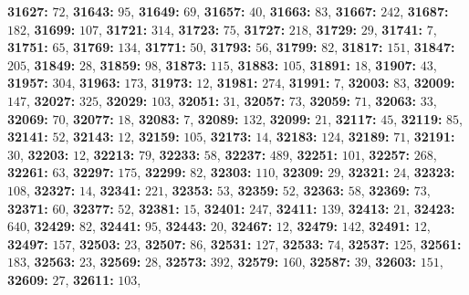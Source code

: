 \textsf{\bfseries 31627:} $72$, \textsf{\bfseries 31643:} $95$, \textsf{\bfseries 31649:} $69$, \textsf{\bfseries 31657:} $40$, \textsf{\bfseries 31663:} $83$, \textsf{\bfseries 31667:} $242$, \textsf{\bfseries 31687:} $182$, \textsf{\bfseries 31699:} $107$, \textsf{\bfseries 31721:} $314$, \textsf{\bfseries 31723:} $75$, \textsf{\bfseries 31727:} $218$, \textsf{\bfseries 31729:} $29$, \textsf{\bfseries 31741:} $7$, \textsf{\bfseries 31751:} $65$, \textsf{\bfseries 31769:} $134$, \textsf{\bfseries 31771:} $50$, \textsf{\bfseries 31793:} $56$, \textsf{\bfseries 31799:} $82$, \textsf{\bfseries 31817:} $151$, \textsf{\bfseries 31847:} $205$, \textsf{\bfseries 31849:} $28$, \textsf{\bfseries 31859:} $98$, \textsf{\bfseries 31873:} $115$, \textsf{\bfseries 31883:} $105$, \textsf{\bfseries 31891:} $18$, \textsf{\bfseries 31907:} $43$, \textsf{\bfseries 31957:} $304$, \textsf{\bfseries 31963:} $173$, \textsf{\bfseries 31973:} $12$, \textsf{\bfseries 31981:} $274$, \textsf{\bfseries 31991:} $7$, \textsf{\bfseries 32003:} $83$, \textsf{\bfseries 32009:} $147$, \textsf{\bfseries 32027:} $325$, \textsf{\bfseries 32029:} $103$, \textsf{\bfseries 32051:} $31$, \textsf{\bfseries 32057:} $73$, \textsf{\bfseries 32059:} $71$, \textsf{\bfseries 32063:} $33$, \textsf{\bfseries 32069:} $70$, \textsf{\bfseries 32077:} $18$, \textsf{\bfseries 32083:} $7$, \textsf{\bfseries 32089:} $132$, \textsf{\bfseries 32099:} $21$, \textsf{\bfseries 32117:} $45$, \textsf{\bfseries 32119:} $85$, \textsf{\bfseries 32141:} $52$, \textsf{\bfseries 32143:} $12$, \textsf{\bfseries 32159:} $105$, \textsf{\bfseries 32173:} $14$, \textsf{\bfseries 32183:} $124$, \textsf{\bfseries 32189:} $71$, \textsf{\bfseries 32191:} $30$, \textsf{\bfseries 32203:} $12$, \textsf{\bfseries 32213:} $79$, \textsf{\bfseries 32233:} $58$, \textsf{\bfseries 32237:} $489$, \textsf{\bfseries 32251:} $101$, \textsf{\bfseries 32257:} $268$, \textsf{\bfseries 32261:} $63$, \textsf{\bfseries 32297:} $175$, \textsf{\bfseries 32299:} $82$, \textsf{\bfseries 32303:} $110$, \textsf{\bfseries 32309:} $29$, \textsf{\bfseries 32321:} $24$, \textsf{\bfseries 32323:} $108$, \textsf{\bfseries 32327:} $14$, \textsf{\bfseries 32341:} $221$, \textsf{\bfseries 32353:} $53$, \textsf{\bfseries 32359:} $52$, \textsf{\bfseries 32363:} $58$, \textsf{\bfseries 32369:} $73$, \textsf{\bfseries 32371:} $60$, \textsf{\bfseries 32377:} $52$, \textsf{\bfseries 32381:} $15$, \textsf{\bfseries 32401:} $247$, \textsf{\bfseries 32411:} $139$, \textsf{\bfseries 32413:} $21$, \textsf{\bfseries 32423:} $640$, \textsf{\bfseries 32429:} $82$, \textsf{\bfseries 32441:} $95$, \textsf{\bfseries 32443:} $20$, \textsf{\bfseries 32467:} $12$, \textsf{\bfseries 32479:} $142$, \textsf{\bfseries 32491:} $12$, \textsf{\bfseries 32497:} $157$, \textsf{\bfseries 32503:} $23$, \textsf{\bfseries 32507:} $86$, \textsf{\bfseries 32531:} $127$, \textsf{\bfseries 32533:} $74$, \textsf{\bfseries 32537:} $125$, \textsf{\bfseries 32561:} $183$, \textsf{\bfseries 32563:} $23$, \textsf{\bfseries 32569:} $28$, \textsf{\bfseries 32573:} $392$, \textsf{\bfseries 32579:} $160$, \textsf{\bfseries 32587:} $39$, \textsf{\bfseries 32603:} $151$, \textsf{\bfseries 32609:} $27$, \textsf{\bfseries 32611:} $103$, 
